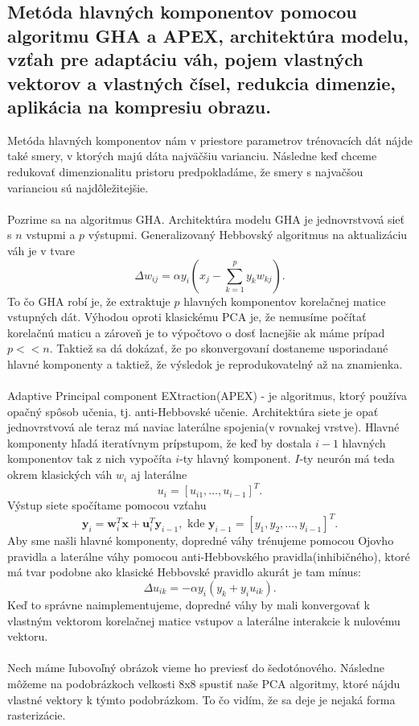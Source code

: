 \documentclass{article}
\numberwithin{equation}{section} %
\begin{document}
\subsection{Metóda hlavných komponentov pomocou algoritmu GHA a APEX, architektúra modelu, vzťah pre adaptáciu váh, pojem vlastných vektorov a vlastných čísel, redukcia dimenzie, aplikácia na kompresiu obrazu.}

Metóda hlavných komponentov nám v priestore parametrov trénovacích dát nájde také smery, v ktorých majú dáta najväčšiu varianciu. Následne keď chceme redukovať dimenzionalitu pristoru predpokladáme, že smery s najvačšou varianciou sú najdôležitejšie.
\\\\
Pozrime sa na algoritmus GHA. Architektúra modelu GHA je jednovrstvová sieť s $n$ vstupmi a $p$ výstupmi. Generalizovaný Hebbovský algoritmus na aktualizáciu váh je v tvare
 $$\Delta w_{ij} = \alpha y_i(x_j - \sum_{k=1}^p y_kw_{kj}).$$
To čo GHA robí je, že extraktuje $p$ hlavných komponentov korelačnej matice vstupných dát. Výhodou oproti klasickému PCA je, že nemusíme počítať korelačnú maticu a zároveň je to výpočtovo o dosť lacnejšie ak máme prípad $p << n$. Taktiež sa dá dokázať, že po skonvergovaní dostaneme usporiadané hlavné komponenty a taktiež, že výsledok je reprodukovatelný až na znamienka. 
\\\\
Adaptive Principal component EXtraction(APEX) - je algoritmus, ktorý používa opačný spôsob učenia, tj. anti-Hebbovské učenie. Architektúra siete je opať jednovrstvová ale teraz má naviac laterálne spojenia(v rovnakej vrstve). Hlavné komponenty hľadá iteratívnym prípstupom, že keď by dostala $i-1$ hlavných komponentov tak z nich vypočíta $i$-ty hlavný komponent. $I$-ty neurón má teda okrem klasických váh $w_i$ aj laterálne $$u_i = [u_{i1}, \dots, u_{i-1}]^T.$$ Výstup siete spočítame pomocou vzťahu 
$$ \textbf{y}_i = \textbf{w}_i^T\textbf{x} + \textbf{u}_i^T\textbf{y}_{i-1}, \text{  kde } \textbf{y}_{i-1} = [y_1, y_2, \dots, y_{i-1}]^T. $$
Aby sme našli hlavné komponenty, dopredné váhy trénujeme pomocou Ojovho pravidla a laterálne váhy pomocou anti-Hebbovského pravidla(inhibičného), ktoré má tvar podobne ako klasické Hebbovské pravidlo akurát je tam mínus: $$ \Delta u_{ik}= -\alpha y_i(y_k + y_iu_{ik}). $$
Keď to správne naimplementujeme, dopredné váhy by mali konvergovať k vlastným vektorom korelačnej matice vstupov a laterálne interakcie k nulovému vektoru.
\\\\
Nech máme ľubovoľný obrázok vieme ho previesť do šedotónového. Následne môžeme na podobrázkoch velkosti 8x8 spustiť naše PCA algoritmy, ktoré nájdu vlastné vektory k týmto podobrázkom. To čo vidím, že sa deje je nejaká forma rasterizácie.
\end{document}
